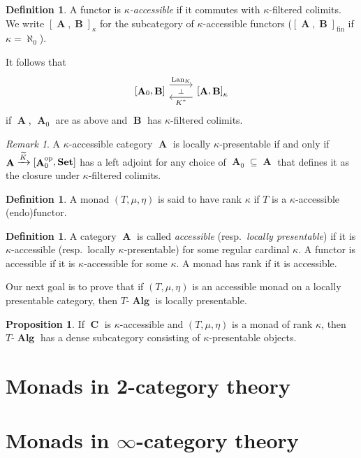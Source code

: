\documentclass[a4paper,11pt,fullpage,oneside,openany]{amsbook}
\newcommand{\catname}[1]{{\normalfont\textbf{#1}}}
\DeclareMathOperator{\Alg}{\mathbf{Alg}}
\newcommand{\Set}{\catname{Set}}
\DeclareMathOperator{\op}{\text{op}}
\DeclareMathOperator{\A}{\mathbf{A}}
\DeclareMathOperator{\B}{\mathbf{B}}
\DeclareMathOperator{\C}{\mathbf{C}}
\DeclareMathOperator{\Lan}{Lan}
\theoremstyle{definition}
\theoremstyle{definition}
\newtheorem{defn}[thm]{Definition} %
\newtheorem{prop}[thm]{Proposition}
\theoremstyle{remark}
\newtheorem{rmk}[thm]{Remark}
\begin{document}
\begin{defn}
A functor is \emph{$\kappa$-accessible} if it commutes with $\kappa$-filtered colimits. We write $\left[\A,\B\right]_\kappa$ for the subcategory of $\kappa$-accessible functors ($\left[\A,\B\right]_{\text{fin}}$ if $\kappa=\aleph_0$).
\end{defn}
It follows that 
 \[
\begin{tikzcd}
\left[\A_0,\B\right]\ar[r, shift left=1.5ex,"\Lan_K",""{name=A, below}] & \left[\A,\B\right]_\kappa\ar[l, shift left=1.5ex, "K^*",""{name=B,above}] \ar[from=A, to=B, "\perp"description]
\end{tikzcd}
      \]
if $\A$, $\A_0$ are as above and $\B$ has $\kappa$-filtered colimits.
\begin{rmk}
    A $\kappa$-accessible category $\A$ is locally $\kappa$-presentable if and only if $\A\xrightarrow{\widetilde{K}}\left[\A_0^{\op},\Set\right]$ has a left adjoint for any choice of $\A_0\subseteq\A$ that defines it as the closure under $\kappa$-filtered colimits.
\end{rmk}
\begin{defn}
A monad $(T,\mu,\eta)$ is said to have rank $\kappa$ if $T$ is a $\kappa$-accessible (endo)functor.
\end{defn}
\begin{defn}
A category $\A$ is called \emph{accessible} (resp.\ \emph{locally presentable}) if it is $\kappa$-accessible (resp.\ locally $\kappa$-presentable) for some regular cardinal $\kappa$. A functor is accessible if it is $\kappa$-accessible for some $\kappa$. A monad has rank if it is accessible.
\end{defn}

Our next goal is to prove that if $(T,\mu,\eta)$ is an accessible monad on a locally presentable category, then $T\mbox{-}\Alg$ is locally presentable.
\begin{prop}
    If $\C$ is $\kappa$-accessible and $(T,\mu,\eta)$ is a monad of rank $\kappa$, then $T\mbox{-}\Alg$ has a dense subcategory consisting of $\kappa$-presentable objects.
\end{prop}


































	\chapter{Monads in 2-category theory}
	
	\chapter{Monads in $\infty$-category theory}
	
	
	
	
	\backmatter
	
\end{document}
